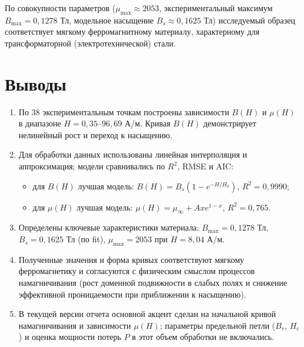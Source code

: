 \documentclass[a4paper,14pt]{article}
\begin{document}
По совокупности параметров ($\mu_{\max}\approx2053$, экспериментальный максимум $B_{\max}=0{,}1278$ Тл, модельное насыщение $B_s\approx0{,}1625$ Тл) исследуемый образец соответствует мягкому ферромагнитному материалу, характерному для трансформаторной (электротехнической) стали.

\section{Выводы}

\begin{enumerate}
    \item По 38 экспериментальным точкам построены зависимости $B(H)$ и $\mu(H)$ в диапазоне $H=0{,}35$--$96{,}69$ А/м. Кривая $B(H)$ демонстрирует нелинейный рост и переход к насыщению.

    \item Для обработки данных использованы линейная интерполяция и аппроксимация; модели сравнивались по $R^2$, RMSE и AIC:
    \begin{itemize}
        \item для $B(H)$ лучшая модель: $B(H)=B_s(1-e^{-H/H_0})$, $R^2=0{,}9990$;
        \item для $\mu(H)$ лучшая модель: $\mu(H)=\mu_{\infty}+Axe^{1-x}$, $R^2=0{,}765$.
    \end{itemize}

    \item Определены ключевые характеристики материала: $B_{\max}=0{,}1278$ Тл, $B_s=0{,}1625$ Тл (по fit), $\mu_{\max}=2053$ при $H=8{,}04$ А/м.

    \item Полученные значения и форма кривых соответствуют мягкому ферромагнетику и согласуются с физическим смыслом процессов намагничивания (рост доменной подвижности в слабых полях и снижение эффективной проницаемости при приближении к насыщению).

    \item В текущей версии отчета основной акцент сделан на начальной кривой намагничивания и зависимости $\mu(H)$; параметры предельной петли ($B_r$, $H_c$) и оценка мощности потерь $P$ в этот объем обработки не включались.
\end{enumerate}
\end{document}
